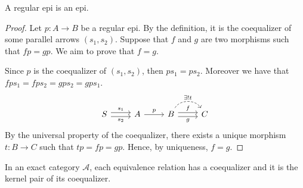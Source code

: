 \begin{mainbox}{}
\begin{prop}\label{reg epi is an epi}
    A regular epi is an epi.
\end{prop}
\end{mainbox}

\begin{subbox}{}
\begin{proof}
    Let $p:A \to B$ be a regular epi. By the definition, it is the coequalizer of some parallel arrows $(s_1,s_2)$. Suppose that $f$ and $g$ are two morphisms such that $fp=gp$. We aim to prove that $f=g$.
    
    Since $p$ is the coequalizer of $(s_1,s_2)$, then $ps_1=ps_2$. Moreover we have that $fps_1=fps_2=gps_2=gps_1$.
    \[
\begin{tikzcd}
S \arrow[r, "s_1", shift left] \arrow[r, "s_2"', shift right] & A \arrow[r, "p"] & B \arrow[r, "f", shift left] \arrow[r, "g"', shift right] \arrow[r, "\exists!t", dashed, bend left=60] & C
\end{tikzcd}
    \]
    By the universal property of the coequalizer, there exists a unique morphism $t: B \to C$ such that $tp=fp=gp$. Hence, by uniqueness, $f=g$.
\end{proof}
\end{subbox}

\begin{mainbox}{}
    \begin{prop}\label{equiv rel is kernel pair of the coeq}
        In an exact category $\mathcal{A}$, each equivalence relation has a coequalizer and it is the kernel pair of its coequalizer.
    \end{prop}
\end{mainbox}

